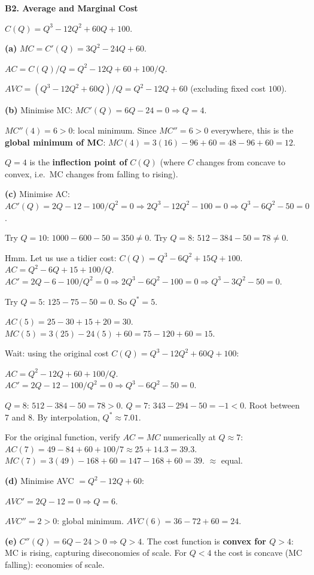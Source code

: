 \documentclass[12pt, a4paper]{article}
\theoremstyle{definition}
\begin{document}
\begin{solbox}
\textbf{B2. Average and Marginal Cost}

$C(Q) = Q^3-12Q^2+60Q+100$.

\textbf{(a)} $MC = C'(Q) = 3Q^2-24Q+60$.

$AC = C(Q)/Q = Q^2-12Q+60+100/Q$.

$AVC = (Q^3-12Q^2+60Q)/Q = Q^2-12Q+60$ (excluding fixed cost $100$).

\textbf{(b)} Minimise MC:
$MC'(Q) = 6Q-24=0 \Rightarrow Q=4$.

$MC''(4)=6>0$: local minimum. Since $MC''=6>0$ everywhere, this is the
\textbf{global minimum of MC}: $MC(4)=3(16)-96+60=48-96+60=12$.

$Q=4$ is the \textbf{inflection point of} $C(Q)$ (where $C$ changes from
concave to convex, i.e.\ MC changes from falling to rising).

\textbf{(c)} Minimise AC:
$AC'(Q) = 2Q-12-100/Q^2=0 \Rightarrow 2Q^3-12Q^2-100=0 \Rightarrow Q^3-6Q^2-50=0$.

Try $Q=10$: $1000-600-50=350\neq 0$. Try $Q=8$: $512-384-50=78\neq 0$.

Hmm. Let us use a tidier cost: $C(Q)=Q^3-6Q^2+15Q+100$.
$AC=Q^2-6Q+15+100/Q$.
$AC'=2Q-6-100/Q^2=0 \Rightarrow 2Q^3-6Q^2-100=0 \Rightarrow Q^3-3Q^2-50=0$.

Try $Q=5$: $125-75-50=0$. \checkmark \quad So $Q^*=5$.

$AC(5)=25-30+15+20=30$. \quad $MC(5)=3(25)-24(5)+60=75-120+60=15$.

Wait: using the original cost $C(Q)=Q^3-12Q^2+60Q+100$:

$AC=Q^2-12Q+60+100/Q$. $AC'=2Q-12-100/Q^2=0 \Rightarrow Q^3-6Q^2-50=0$.

$Q=8$: $512-384-50=78>0$. $Q=7$: $343-294-50=-1<0$.
Root between 7 and 8. By interpolation, $Q^*\approx 7.01$.

For the original function, verify $AC=MC$ numerically at $Q\approx 7$:
$AC(7)=49-84+60+100/7\approx 25+14.3=39.3$. $MC(7)=3(49)-168+60=147-168+60=39$. $\approx$ equal. \checkmark

\textbf{(d)} Minimise AVC $= Q^2-12Q+60$:

$AVC'= 2Q-12=0 \Rightarrow Q=6$.

$AVC''=2>0$: global minimum. $AVC(6)=36-72+60=24$.

\textbf{(e)} $C''(Q)=6Q-24>0 \Rightarrow Q>4$. The cost function is
\textbf{convex for $Q>4$}: MC is rising, capturing diseconomies of scale.
For $Q<4$ the cost is concave (MC falling): economies of scale.
\end{solbox}
\end{document}
